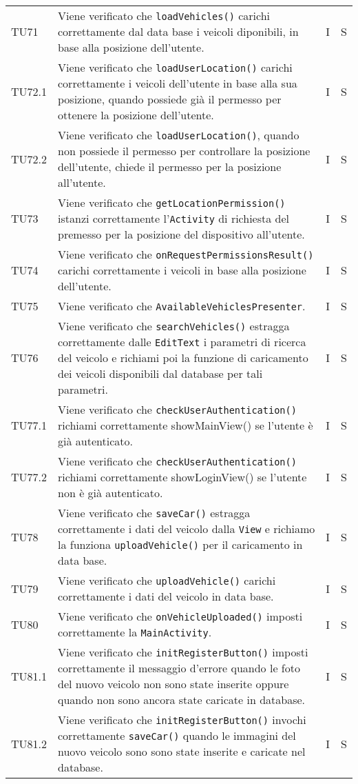 \begin{longtable}{ >{\centering}p{}  >{\centering}p{} >{\centering}p{}
			>{\centering}p{}}
		TU71 & Viene verificato che \texttt{loadVehicles()} carichi correttamente dal data base i veicoli diponibili, in base alla posizione dell'utente. & I & S
		\tabularnewline	
		TU72.1 & Viene verificato che \texttt{loadUserLocation()} carichi correttamente i veicoli dell'utente in base alla sua posizione, quando possiede già il permesso per ottenere la posizione dell'utente. & I & S
		\tabularnewline	
		TU72.2 & Viene verificato che \texttt{loadUserLocation()}, quando non possiede il permesso per controllare la posizione dell'utente, chiede il permesso per la posizione all'utente. & I & S
		\tabularnewline	
		TU73 & Viene verificato che \texttt{getLocationPermission()} istanzi correttamente l'\texttt{Activity} di richiesta del premesso per la posizione del dispositivo all'utente. & I & S
		\tabularnewline	
		TU74 & Viene verificato che \texttt{onRequestPermissionsResult()} carichi correttamente i veicoli in base alla posizione dell'utente. & I & S
		\tabularnewline	
		TU75 & Viene verificato che \texttt{AvailableVehiclesPresenter}. & I & S
		\tabularnewline	
		TU76 & Viene verificato che \texttt{searchVehicles()} estragga correttamente dalle \texttt{EditText} i parametri di ricerca del veicolo e richiami poi la funzione di caricamento dei veicoli disponibili dal database per tali parametri. & I & S
		\tabularnewline	
		TU77.1 & Viene verificato che \texttt{checkUserAuthentication()} richiami correttamente showMainView() se l'utente è già autenticato. & I & S
		\tabularnewline	
		TU77.2 & Viene verificato che \texttt{checkUserAuthentication()} richiami correttamente showLoginView() se l'utente non è già autenticato. & I & S
		\tabularnewline	
		TU78 & Viene verificato che \texttt{saveCar()} estragga correttamente i dati del veicolo dalla \texttt{View} e richiamo la funziona \texttt{uploadVehicle()} per il caricamento in data base. & I & S
		\tabularnewline	
		TU79 & Viene verificato che \texttt{uploadVehicle()} carichi correttamente i dati del veicolo in data base. & I & S
		\tabularnewline	
		TU80 & Viene verificato che \texttt{onVehicleUploaded()} imposti correttamente la \texttt{MainActivity}. & I & S
		\tabularnewline	
		TU81.1 & Viene verificato che \texttt{initRegisterButton()} imposti correttamente il messaggio d'errore quando le foto del nuovo veicolo non sono state inserite oppure quando non sono ancora state caricate in database. & I & S
		\tabularnewline	
		TU81.2 & Viene verificato che \texttt{initRegisterButton()} invochi correttamente \texttt{saveCar()} quando le immagini del nuovo veicolo sono sono state inserite e caricate nel database. & I & S

\end{longtable}
